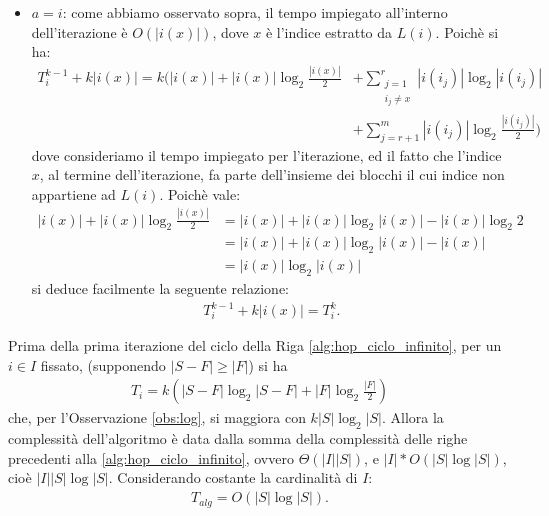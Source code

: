 \begin{proof2}
\begin{itemize}
\begin{itemize}
            \begin{align*}
                c \log_2 c + (b-c) \log_2 \frac{b-c}{2} &\leq c \log_2 \frac{b}{2} + (b-c) \log_2 \frac{b}{2}\\
                &= (c + b - c) \log_2 \frac{b}{2}\\
                &= b \log_2 \frac{b}{2}.
            \end{align*}
        \end{itemize}
        \item $a = i$: come abbiamo osservato sopra, il tempo impiegato all'interno dell'iterazione è $O(|i(x)|)$, dove $x$ è l'indice estratto da $L(i)$. Poichè si ha:
        \begin{align*}
            T_i^{k-1} + k|i(x)| = k \Bigg( |i(x)| + |i(x)|\log_2 \frac{|i(x)|}{2} &+ \sum_{\substack{j = 1\\i_j \neq x}}^r |i(i_j)|\log_2|i(i_j)| \\
            &+ \sum_{j = r+1}^m |i(i_j)|\log_2\frac{|i(i_j)|}{2}\Bigg)
         \end{align*}
        dove consideriamo il tempo impiegato per l'iterazione, ed il fatto che l'indice $x$, al termine dell'iterazione, fa parte dell'insieme dei blocchi il cui indice non appartiene ad $L(i)$. Poichè vale:
        \begin{align*}
            |i(x)| + |i(x)|\log_2 \frac{|i(x)|}{2} &= |i(x)| + |i(x)|\log_2 |i(x)| - |i(x)|\log_2 2\\
            &= |i(x)| + |i(x)|\log_2 |i(x)| - |i(x)|\\
            &= |i(x)|\log_2 |i(x)|
        \end{align*}
        si deduce facilmente la seguente relazione:
        \begin{gather*}
            T_i^{k-1} + k|i(x)| = T_i^k.
        \end{gather*}
    \end{itemize}
    \vspace*{-0.8cm}
\end{proof2}
Prima della prima iterazione del ciclo della Riga \ref{alg:hop_ciclo_infinito}, per un $i \in I$ fissato, (supponendo $|S-F| \geq |F|$) si ha
\begin{gather*}
    T_i = k\left(|S-F|\log_2|S-F| + |F|\log_2\frac{|F|}{2}\right)
\end{gather*}
che, per l'Osservazione \ref{obs:log}, si maggiora con $k |S|\log_2|S|$. Allora la complessità dell'algoritmo è data dalla somma della complessità delle righe precedenti alla \ref{alg:hop_ciclo_infinito}, ovvero $\Theta(|I||S|)$, e $|I| * O(|S|\log|S|)$, cioè $|I||S|\log|S|$. Considerando costante la cardinalità di $I$:
\begin{gather*}
    T_{alg} = O(|S|\log|S|).
\end{gather*}

